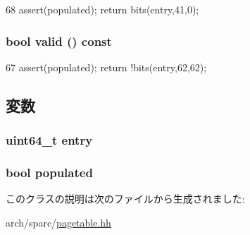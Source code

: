 \begin{DoxyCode}
68 { assert(populated); return bits(entry,41,0); }
\end{DoxyCode}
\hypertarget{classSparcISA_1_1TteTag_a8d985300b138b6c5556ab17ed4df3b38}{
\subsubsection[{valid}]{\setlength{\rightskip}{0pt plus 5cm}bool valid () const}}
\label{classSparcISA_1_1TteTag_a8d985300b138b6c5556ab17ed4df3b38}



\begin{DoxyCode}
67 { assert(populated); return !bits(entry,62,62); }
\end{DoxyCode}


\subsection{変数}
\hypertarget{classSparcISA_1_1TteTag_a6aac0a1a7d70f8270f9bb1222445f370}{
\subsubsection[{entry}]{\setlength{\rightskip}{0pt plus 5cm}uint64\_\-t {\bf entry}}}
\label{classSparcISA_1_1TteTag_a6aac0a1a7d70f8270f9bb1222445f370}
\hypertarget{classSparcISA_1_1TteTag_a09092dab7a486a492b9b5fd4adee5c48}{
\subsubsection[{populated}]{\setlength{\rightskip}{0pt plus 5cm}bool {\bf populated}}}
\label{classSparcISA_1_1TteTag_a09092dab7a486a492b9b5fd4adee5c48}


このクラスの説明は次のファイルから生成されました:\begin{DoxyCompactItemize}
\item 
arch/sparc/\hyperlink{sparc_2pagetable_8hh}{pagetable.hh}\end{DoxyCompactItemize}
